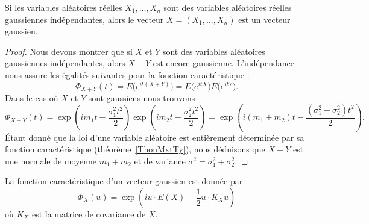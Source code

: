 \begin{lemma}
	Si les variables aléatoires réelles \( X_1,\ldots, X_n\) sont des variables aléatoires réelles gaussiennes indépendantes, alors le vecteur \( X=(X_1,\ldots, X_n)\) est un vecteur gaussien.
\end{lemma}

\begin{proof}
	Nous devons montrer que si \( X\) et \( Y\) sont des variables aléatoires gaussiennes indépendantes, alors \( X+Y\) est encore gaussienne. L'indépendance nous assure les égalités suivantes pour la fonction caractéristique :
	\begin{equation}
		\Phi_{X+Y}(t)=E\big(  e^{it(X+Y)} \big)=E\big(  e^{itX} \big)E\big(  e^{itY} \big).
	\end{equation}
	Dans le cas où \( X\) et \( Y\) sont gaussiens nous trouvons
	\begin{equation}
		\Phi_{X+Y}(t)=\exp\left( im_1t-\frac{ \sigma_1^2t^2 }{2} \right)\exp\left( im_2t-\frac{ \sigma_2^2t^2 }{2} \right)=\exp\left( i(m_1+m_2)t-\frac{ (\sigma_1^2+\sigma_2^2)t^2 }{2} \right).
	\end{equation}
	Étant donné que la loi d'une variable aléatoire est entièrement déterminée par sa fonction caractéristique (théorème~\ref{ThonMxtTy}), nous déduisons que \( X+Y\) est une normale de moyenne \( m_1+m_2\) et de variance \( \sigma^2=\sigma_1^2+\sigma_2^2\).
\end{proof}

\begin{proposition} \label{Propfmzuol}
	La fonction caractéristique d'un vecteur gaussien est donnée par
	\begin{equation}
		\Phi_X(u)=\exp\left( iu\cdot E(X)- \frac{ 1 }{2} u\cdot K_Xu \right)
	\end{equation}
	où \( K_X\) est la matrice de covariance de \( X\).
\end{proposition}

